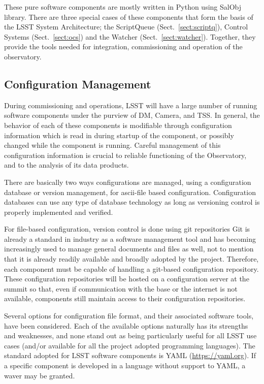 These pure software components are mostly written in Python using SalObj library. There are three special cases of these 
components that form the basis of the LSST System Architecture; the ScriptQueue (Sect.~\ref{sect:scriptq}), Control 
Systems (Sect.~\ref{sect:ocs}) and the Watcher (Sect.~\ref{sect:watcher}). Together, they provide the tools needed for 
integration, commissioning and operation of the observatory.

\subsection{Configuration Management}\label{sect:config}
During commissioning and operations, LSST will have a large number of running software components under the purview of DM, 
Camera, and TSS. In general, the behavior of each of these components is modifiable through configuration information which 
is read in during startup of the component, or possibly changed while the component is running. Careful management of 
this configuration information is crucial to reliable functioning of the Observatory, and to the analysis of its data products.

There are basically two ways configurations are managed, using a configuration database or version management, for 
ascii-file based configuration. Configuration databases can use any type of database technology as long as versioning 
control is properly implemented and verified. 

For file-based configuration, version control is done using git repositories
Git is already a standard in industry as a software management tool and has becoming increasingly used 
to manage general documents and files as well, not to mention that it is already readily available and broadly adopted by the 
project. Therefore, each component must be capable of handling a git-based configuration repository.
These configuration repositories will be hosted on a configuration server at the summit so that, even if communication with the 
base or the internet is not available, components still maintain access to their configuration repositories. 

Several options for configuration file format, and their associated software tools, have been considered. Each of the 
available options naturally has its strengths and weaknesses, and none stand out as being particularly useful for all LSST 
use cases (and/or available for all the project adopted programming languages). The standard adopted for LSST 
software components is YAML (\url{https://yaml.org}). If a specific component is developed in a language without support
to YAML, a waver may be granted.








